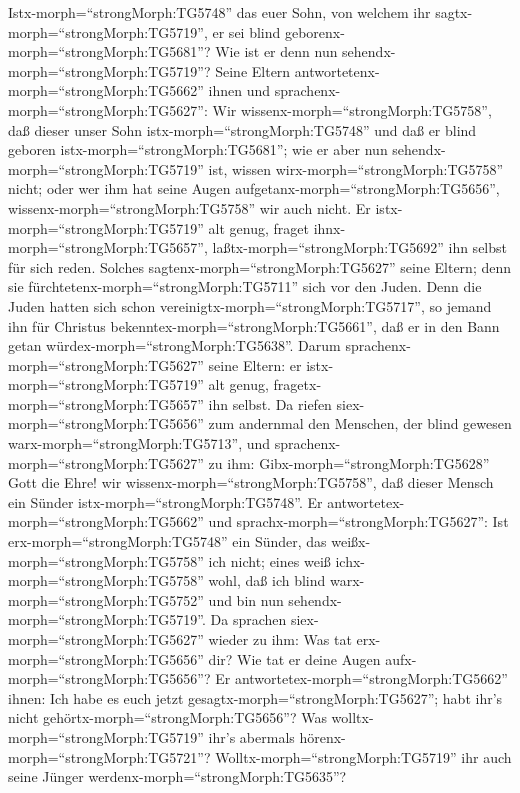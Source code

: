 Istx-morph=``strongMorph:TG5748'' das euer Sohn, von welchem ihr
sagtx-morph=``strongMorph:TG5719'', er sei blind
geborenx-morph=``strongMorph:TG5681''? Wie ist er denn nun
sehendx-morph=``strongMorph:TG5719''?  Seine Eltern
antwortetenx-morph=``strongMorph:TG5662'' ihnen und
sprachenx-morph=``strongMorph:TG5627'': Wir
wissenx-morph=``strongMorph:TG5758'', daß dieser unser Sohn
istx-morph=``strongMorph:TG5748'' und daß er blind geboren
istx-morph=``strongMorph:TG5681'';  wie er aber nun
sehendx-morph=``strongMorph:TG5719'' ist, wissen
wirx-morph=``strongMorph:TG5758'' nicht; oder wer ihm hat seine Augen
aufgetanx-morph=``strongMorph:TG5656'',
wissenx-morph=``strongMorph:TG5758'' wir auch nicht. Er
istx-morph=``strongMorph:TG5719'' alt genug, fraget
ihnx-morph=``strongMorph:TG5657'', laßtx-morph=``strongMorph:TG5692''
ihn selbst für sich reden.  Solches
sagtenx-morph=``strongMorph:TG5627'' seine Eltern; denn sie
fürchtetenx-morph=``strongMorph:TG5711'' sich vor den Juden. Denn die
Juden hatten sich schon vereinigtx-morph=``strongMorph:TG5717'', so
jemand ihn für Christus bekenntex-morph=``strongMorph:TG5661'', daß er
in den Bann getan würdex-morph=``strongMorph:TG5638''. 
Darum sprachenx-morph=``strongMorph:TG5627'' seine Eltern: er
istx-morph=``strongMorph:TG5719'' alt genug,
fragetx-morph=``strongMorph:TG5657'' ihn selbst.  Da riefen
siex-morph=``strongMorph:TG5656'' zum andernmal den Menschen, der blind
gewesen warx-morph=``strongMorph:TG5713'', und
sprachenx-morph=``strongMorph:TG5627'' zu ihm:
Gibx-morph=``strongMorph:TG5628'' Gott die Ehre! wir
wissenx-morph=``strongMorph:TG5758'', daß dieser Mensch ein Sünder
istx-morph=``strongMorph:TG5748''.  Er
antwortetex-morph=``strongMorph:TG5662'' und
sprachx-morph=``strongMorph:TG5627'': Ist
erx-morph=``strongMorph:TG5748'' ein Sünder, das
weißx-morph=``strongMorph:TG5758'' ich nicht; eines weiß
ichx-morph=``strongMorph:TG5758'' wohl, daß ich blind
warx-morph=``strongMorph:TG5752'' und bin nun
sehendx-morph=``strongMorph:TG5719''.  Da sprachen
siex-morph=``strongMorph:TG5627'' wieder zu ihm: Was tat
erx-morph=``strongMorph:TG5656'' dir? Wie tat er deine Augen
aufx-morph=``strongMorph:TG5656''?  Er
antwortetex-morph=``strongMorph:TG5662'' ihnen: Ich habe es euch jetzt
gesagtx-morph=``strongMorph:TG5627''; habt ihr's nicht
gehörtx-morph=``strongMorph:TG5656''? Was
wolltx-morph=``strongMorph:TG5719'' ihr's abermals
hörenx-morph=``strongMorph:TG5721''? Wolltx-morph=``strongMorph:TG5719''
ihr auch seine Jünger werdenx-morph=``strongMorph:TG5635''?
